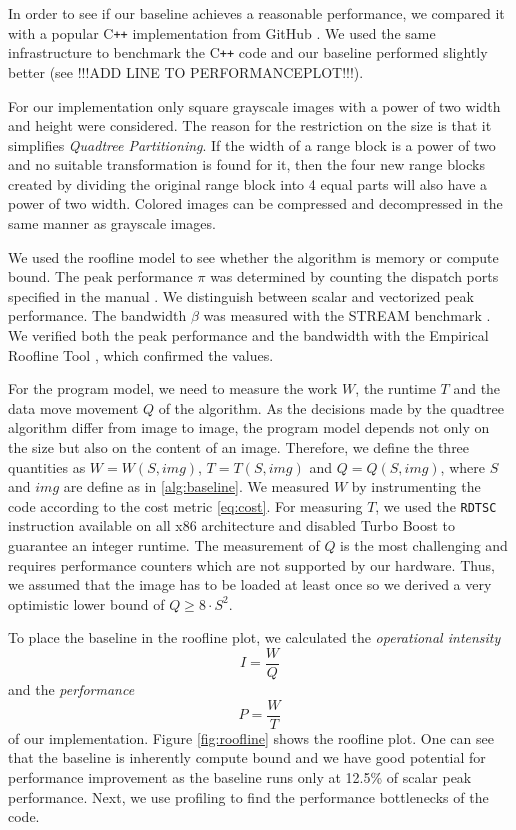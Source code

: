 In order to see if our baseline achieves a reasonable performance, we compared it with
a popular C\texttt{++} implementation from GitHub \cite{github-cpp}. We used the same infrastructure to benchmark
the C\texttt{++} code and our baseline performed slightly better (see !!!ADD LINE TO PERFORMANCEPLOT!!!).

 For our implementation only square grayscale images with a power
of two width and height were considered. The reason for the restriction on the
size is that it simplifies \textit{Quadtree Partitioning}. If the width of a
range block is a power of two and no suitable transformation is found for it,
then the four new range blocks created by dividing the original range block into
4 equal parts will also have a power of two width. Colored images can be
compressed and decompressed in the same manner as grayscale images.


 We used the roofline model \cite{applying-roofline} to see whether the algorithm is memory or
compute bound. The peak performance $\pi$ was determined by counting the dispatch
ports specified in the manual \cite{intel-opt-manual}. We distinguish between scalar and vectorized peak
performance. The bandwidth $\beta$ was measured with the STREAM benchmark \cite{stream}. We verified both the peak
performance and the bandwidth with the Empirical Roofline Tool \cite{ert}, which confirmed the values.

For the program model, we need to measure the work $W$, the runtime $T$ and the data move movement $Q$ of
the algorithm. As the decisions made by the quadtree algorithm differ from image to image, the program
model depends not only on the size but also on the content of an image. Therefore, we define the three 
quantities as $W=W(S, img)$, $T=T(S, img)$ and $Q=Q(S, img)$, where $S$ and $img$ are define as in 
\ref{alg:baseline}. We measured $W$ by instrumenting the code according to the cost metric \ref{eq:cost}.
For measuring $T$, we used the \texttt{RDTSC} instruction available on all x86 architecture and disabled
Turbo Boost to guarantee an integer runtime. The measurement of $Q$ is the most challenging and requires
performance counters which are not supported by our hardware. Thus, we assumed that the image has to be
loaded at least once so we derived a very optimistic lower bound of $Q \geq 8 \cdot S^2$.

To place the baseline in the roofline plot, we calculated the \textit{operational intensity}
$$
I=\frac{W}{Q}
$$
and the \textit{performance}
$$P=\frac{W}{T}$$
of our implementation. Figure \ref{fig:roofline} shows the 
roofline plot. One can see that the baseline is inherently compute bound and we have good potential for
performance improvement as the baseline runs only at 12.5\% of scalar peak performance. Next, we use 
profiling to find the performance bottlenecks of the code.

